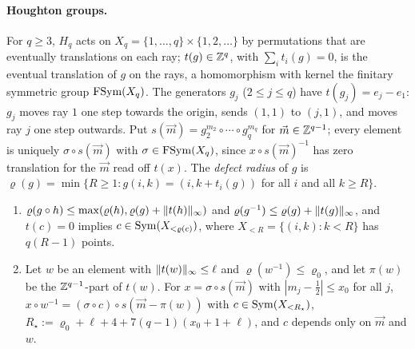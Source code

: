 \paragraph{Houghton groups.} For $q\ge3$, $H_q$ acts on $X_q=\{1,\dots,q\}\times\{1,2,\dots\}$ by permutations that are eventually translations on each ray; $t(g)\in\mathbb Z^q$, with
$\sum_it_i(g)=0$, is the eventual translation of $g$ on the rays, a homomorphism with kernel the finitary symmetric group $\operatorname{FSym}(X_q)$. The generators $g_j$ ($2\le j\le q$)
have $t(g_j)=e_j-e_1$: $g_j$ moves ray $1$ one step towards the origin, sends $(1,1)$ to $(j,1)$, and moves ray $j$ one step outwards. Put
$s(\vec m)=g_2^{m_2}\circ\cdots\circ g_q^{m_q}$ for $\vec m\in\mathbb Z^{q-1}$; every element is uniquely $\sigma\circ s(\vec m)$ with $\sigma\in\operatorname{FSym}(X_q)$, since $x\circ s(\vec m)^{-1}$ has zero
translation for the $\vec m$ read off $t(x)$. The \emph{defect radius} of $g$ is $\varrho(g)=\min\{R\ge1:g(i,k)=(i,k+t_i(g))$ for all $i$ and all $k\ge R\}$.

\begin{lemma}\label{lem:houghton-cocycle}
\begin{enumerate}[label=(\alph*),itemsep=1pt]
\item $\varrho(g\circ h)\le\max(\varrho(h),\varrho(g)+\lVert t(h)\rVert_\infty)$ and $\varrho(g^{-1})\le\varrho(g)+\lVert t(g)\rVert_\infty$, and $t(c)=0$ implies $c\in\operatorname{Sym}(X_{<\varrho(c)})$, where
$X_{<R}=\{(i,k):k<R\}$ has $q(R-1)$ points.
\item Let $w$ be an element with $\lVert t(w)\rVert_\infty\le\ell$ and $\varrho(w^{-1})\le\varrho_0$, and let $\pi(w)$ be the $\mathbb Z^{q-1}$-part of $t(w)$. For $x=\sigma\circ s(\vec m)$ with
$|m_j-\frac12|\le x_0$ for all $j$, $x\circ w^{-1}=(\sigma\circ c)\circ s(\vec m-\pi(w))$ with $c\in\operatorname{Sym}(X_{<R_\star})$, $R_\star:=\varrho_0+\ell+4+7(q-1)(x_0+1+\ell)$, and $c$ depends
only on $\vec m$ and $w$.
\end{enumerate}
\end{lemma}

